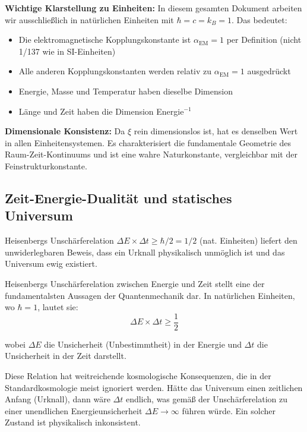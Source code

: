 	\textbf{Wichtige Klarstellung zu Einheiten:}
	In diesem gesamten Dokument arbeiten wir ausschließ{}lich in natürlichen Einheiten mit $\hbar = c = k_B = 1$. Das bedeutet:
	\begin{itemize}
		\item Die elektromagnetische Kopplungskonstante ist $\alpha_{\text{EM}} = 1$ per Definition (nicht 1/137 wie in SI-Einheiten)
		\item Alle anderen Kopplungskonstanten werden relativ zu $\alpha_{\text{EM}} = 1$ ausgedrückt
		\item Energie, Masse und Temperatur haben dieselbe Dimension
		\item Länge und Zeit haben die Dimension Energie$^{-1}$
	\end{itemize}
	
	\textbf{Dimensionale Konsistenz:} Da $\xi$ rein dimensionslos ist, hat es denselben Wert in allen Einheitensystemen. Es charakterisiert die fundamentale Geometrie des Raum-Zeit-Kontinuums und ist eine wahre Naturkonstante, vergleichbar mit der Feinstrukturkonstante.
	
	\subsection{Zeit-Energie-Dualität und statisches Universum}
	
	\begin{important}
		Heisenbergs Unschärferelation $\Delta E \times \Delta t \geq \hbar/2 = 1/2$ (nat. Einheiten) liefert den unwiderlegbaren Beweis, dass ein Urknall physikalisch unmöglich ist und das Universum ewig existiert.
	\end{important}
	
	Heisenbergs Unschärferelation zwischen Energie und Zeit stellt eine der fundamentalsten Aussagen der Quantenmechanik dar. In natürlichen Einheiten, wo $\hbar = 1$, lautet sie:
	\begin{equation}
		\Delta E \times \Delta t \geq \frac{1}{2}
	\end{equation}
	
	wobei $\Delta E$ die Unsicherheit (Unbestimmtheit) in der Energie und $\Delta t$ die Unsicherheit in der Zeit darstellt.
	
	Diese Relation hat weitreichende kosmologische Konsequenzen, die in der Standardkosmologie meist ignoriert werden. Hätte das Universum einen zeitlichen Anfang (Urknall), dann wäre $\Delta t$ endlich, was gemäß{} der Unschärferelation zu einer unendlichen Energieunsicherheit $\Delta E \to \infty$ führen würde. Ein solcher Zustand ist physikalisch inkonsistent.
	
